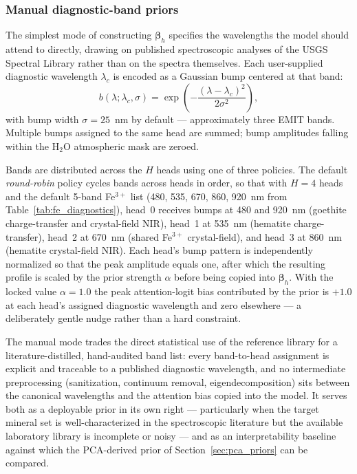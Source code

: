 \documentclass[preprint,12pt]{elsarticle}
\begin{document}
\subsubsection{Manual diagnostic-band priors}
\label{sec:manual_priors}

The simplest mode of constructing $\bm{\beta}_h$ specifies the wavelengths the model should attend to directly, drawing on published spectroscopic analyses of the USGS Spectral Library rather than on the spectra themselves.
Each user-supplied diagnostic wavelength $\lambda_c$ is encoded as a Gaussian bump centered at that band:
\begin{equation}
b(\lambda; \lambda_c, \sigma) = \exp\!\left( -\frac{(\lambda - \lambda_c)^2}{2\sigma^2} \right),
\label{eq:gaussian_bump}
\end{equation}
with bump width $\sigma = 25$~nm by default --- approximately three EMIT bands.
Multiple bumps assigned to the same head are summed; bump amplitudes falling within the H$_2$O atmospheric mask are zeroed.

Bands are distributed across the $H$ heads using one of three policies.
The default \emph{round-robin} policy cycles bands across heads in order, so that with $H = 4$ heads and the default 5-band Fe$^{3+}$ list (480, 535, 670, 860, 920~nm from Table~\ref{tab:fe_diagnostics}), head~0 receives bumps at 480 and 920~nm (goethite charge-transfer and crystal-field NIR), head~1 at 535~nm (hematite charge-transfer), head~2 at 670~nm (shared Fe$^{3+}$ crystal-field), and head~3 at 860~nm (hematite crystal-field NIR).
Each head's bump pattern is independently normalized so that the peak amplitude equals one, after which the resulting profile is scaled by the prior strength $\alpha$ before being copied into $\bm{\beta}_h$.
With the locked value $\alpha = 1.0$ the peak attention-logit bias contributed by the prior is $+1.0$ at each head's assigned diagnostic wavelength and zero elsewhere --- a deliberately gentle nudge rather than a hard constraint.

The manual mode trades the direct statistical use of the reference library for a literature-distilled, hand-audited band list: every band-to-head assignment is explicit and traceable to a published diagnostic wavelength, and no intermediate preprocessing (sanitization, continuum removal, eigendecomposition) sits between the canonical wavelengths and the attention bias copied into the model.
It serves both as a deployable prior in its own right --- particularly when the target mineral set is well-characterized in the spectroscopic literature but the available laboratory library is incomplete or noisy --- and as an interpretability baseline against which the PCA-derived prior of Section~\ref{sec:pca_priors} can be compared.
\end{document}

